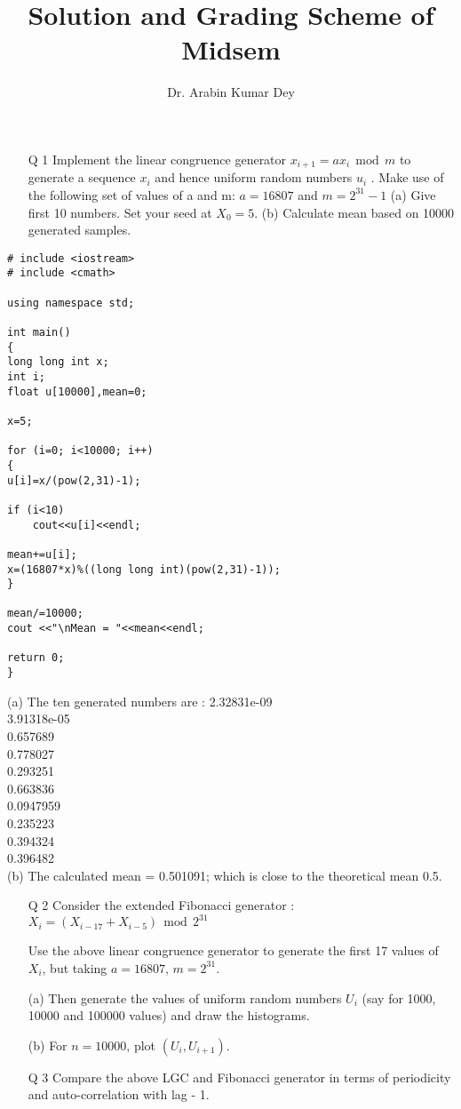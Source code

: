 \documentclass[11pt]{article}
\title{Solution and Grading Scheme of Midsem}
\author{Dr. Arabin Kumar Dey}
\begin{document}
\titlepage
\newpage

\begin{enumerate}
\item[Q 1]  Implement the linear congruence generator
$x_{i+1} = a x_i ~~ \mbox{mod} ~~ m$
to generate a sequence $x_i$ and hence uniform random numbers $u_i$ .
Make use of the following set of values of a and m:
 $a = 16807$ and $m = 2^{31} - 1$
(a) Give first 10 numbers. Set your seed at $X_{0} = 5$.
(b) Calculate mean based on 10000 generated samples. 
\end{enumerate}


\begin{lstlisting}
# include <iostream>
# include <cmath>

using namespace std;

int main()
{
long long int x;
int i;
float u[10000],mean=0;

x=5;

for (i=0; i<10000; i++)
{
u[i]=x/(pow(2,31)-1);

if (i<10)
	cout<<u[i]<<endl;

mean+=u[i];
x=(16807*x)%((long long int)(pow(2,31)-1));
}

mean/=10000;
cout <<"\nMean = "<<mean<<endl;

return 0;
}

\end{lstlisting}


(a)  The ten generated numbers are :
2.32831e-09\\
3.91318e-05\\
0.657689\\
0.778027\\
0.293251\\
0.663836\\
0.0947959\\
0.235223\\
0.394324\\
0.396482\\

(b) The calculated mean = 0.501091; which is close to the theoretical mean 0.5. 


\begin{enumerate}
\item[Q 2] Consider the extended Fibonacci generator :
$X_i = (X_{i-17} + X_{i-5}) ~~ \mbox{mod} ~~ 2^{31}$

 Use the above linear congruence generator to generate the first 17
values of $X_i$, but taking $a = 16807$, $m = 2^{31}$. 

(a) Then generate the values of uniform random numbers $U_i$ (say for 1000, 10000 and
100000 values) and draw the histograms.

(b) For $n = 10000$, plot $(U_i , U_{i+1}).$

\item[Q 3]  Compare the above LGC and Fibonacci generator in terms of periodicity and auto-correlation with lag - 1. 
\end{enumerate}
\end{document}

